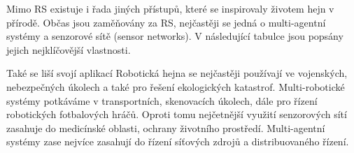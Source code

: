 \par 
Mimo RS existuje i řada jiných přístupů, které se inspirovaly životem hejn v přírodě. Občas jsou zaměňovány za RS, nejčastěji se jedná o multi-agentní systémy a senzorové sítě (sensor networks). V následující tabulce jsou popsány jejich nejklíčovější vlastnosti. \par
\begin{center}
    \begin{table}[h] 
	\caption{Porovnání systémů s více agenty}
    \end{table}
    \end{center}
    Také se liší svojí aplikací Robotická hejna se nejčastěji používají ve vojenských, nebezpečných úkolech a také pro řešení ekologických katastrof. Multi-robotické systémy potkáváme v transportních, skenovacích úkolech, dále pro řízení robotických fotbalových hráčů. Oproti tomu nejčetnější využití senzorových sítí zasahuje do medicínské oblasti, ochrany životního prostředí. Multi-agentní systémy zase nejvíce zasahují do řízení síťových zdrojů a distribuovaného řízení. 
